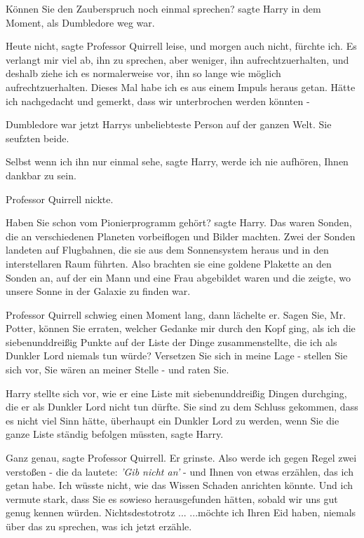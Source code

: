 \glqq{}Können Sie den Zauberspruch noch einmal sprechen?\grqq{} sagte Harry in
dem Moment, als Dumbledore weg war.

\glqq{}Heute nicht\grqq{}, sagte Professor Quirrell leise, \glqq{}und morgen auch
nicht, fürchte ich. Es verlangt mir viel ab, ihn zu sprechen, aber weniger, ihn
aufrechtzuerhalten, und deshalb ziehe ich es normalerweise vor, ihn so lange wie
möglich aufrechtzuerhalten. Dieses Mal habe ich es aus einem Impuls heraus
getan. Hätte ich nachgedacht und gemerkt, dass wir unterbrochen werden könnten
-\grqq{}

Dumbledore war jetzt Harrys unbeliebteste Person auf der ganzen Welt. Sie
seufzten beide.

\glqq{}Selbst wenn ich ihn nur einmal sehe\grqq{}, sagte Harry, \glqq{}werde ich
nie aufhören, Ihnen dankbar zu sein.\grqq{}

Professor Quirrell nickte.

\glqq{}Haben Sie schon vom Pionierprogramm gehört?\grqq{} sagte Harry. \glqq{}Das
waren Sonden, die an verschiedenen Planeten vorbeiflogen und Bilder machten.
Zwei der Sonden landeten auf Flugbahnen, die sie aus dem Sonnensystem heraus und
in den interstellaren Raum führten. Also brachten sie eine goldene Plakette an
den Sonden an, auf der ein Mann und eine Frau abgebildet waren und die zeigte,
wo unsere Sonne in der Galaxie zu finden war.\grqq{}

Professor Quirrell schwieg einen Moment lang, dann lächelte er. \glqq{}Sagen Sie,
Mr. Potter, können Sie erraten, welcher Gedanke mir durch den Kopf ging, als ich
die siebenunddreißig Punkte auf der Liste der Dinge zusammenstellte, die ich als
Dunkler Lord niemals tun würde? Versetzen Sie sich in meine Lage - stellen Sie
sich vor, Sie wären an meiner Stelle - und raten Sie.\grqq{}

Harry stellte sich vor, wie er eine Liste mit siebenunddreißig Dingen durchging,
die er als Dunkler Lord nicht tun dürfte. \glqq{}Sie sind zu dem Schluss
gekommen, dass es nicht viel Sinn hätte, überhaupt ein Dunkler Lord zu werden,
wenn Sie die ganze Liste ständig befolgen müssten\grqq{}, sagte Harry.

\glqq{}Ganz genau\grqq{}, sagte Professor Quirrell. Er grinste. \glqq{}Also werde
ich gegen Regel zwei verstoßen - die da lautete: \emph{'Gib nicht an'} - und
Ihnen von etwas erzählen, das ich getan habe. Ich wüsste nicht, wie das Wissen
Schaden anrichten könnte. Und ich vermute stark, dass Sie es sowieso
herausgefunden hätten, sobald wir uns gut genug kennen würden.
Nichtsdestotrotz ... ...möchte ich Ihren Eid haben, niemals über das zu sprechen,
was ich jetzt erzähle.\grqq{}

